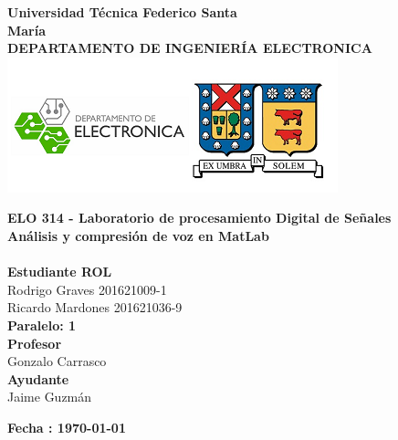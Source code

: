 \documentclass[12pt,a4paper]{article} %
\begin{document}
\begin{titlepage}
\begin{center}
\textbf{\LARGE Universidad Técnica Federico Santa}\\[0.25cm]
\textbf{\LARGE María}\\[0.5cm]
\textbf{\large DEPARTAMENTO DE INGENIERÍA ELECTRONICA}\\[0.2cm]
\vspace{20pt}
\includegraphics{logousm.png}\\[1cm]

\par
\vspace{15pt}
\textbf{\Large ELO 314 - Laboratorio de procesamiento Digital de Señales}\\
\vspace{15pt}
\myrule[1pt][7pt]
\textbf{\LARGE Análisis y compresión de voz en MatLab}\\[0.25cm]
\vspace{15pt}
\textbf{\large  }\\
\myrule[1pt][7pt]
\vspace{55pt}
\textbf{\large Estudiante \hspace{75pt} ROL}\\
    \hspace{0pt}Rodrigo Graves\hspace{80pt} 201621009-1 \\
     Ricardo Mardones      \hspace{60pt} 201621036-9 \\
   


\vspace{30pt}
\textbf{\large Paralelo: \hspace{30pt} 1}\\

\vspace{35pt}
\textbf {\large Profesor}\\[0.2cm]
\Large { Gonzalo Carrasco}\\[0.1cm]
\textbf {\large Ayudante}\\[0.2cm]
\Large {Jaime Guzmán}\\[0.1cm]
\end{center}

\par
\vfill
\begin{center}
\textbf{Fecha : \today}\\
\end{center}

\end{titlepage}
\end{document}
